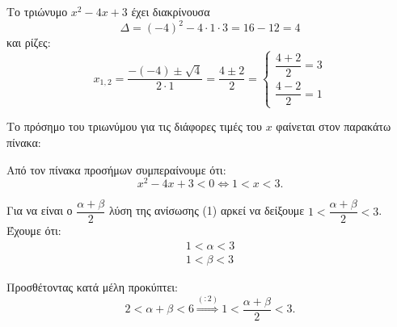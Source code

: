 
\begin{alist}
\item Το τριώνυμο $x^2 - 4x + 3$ έχει διακρίνουσα
\[\Delta = (-4)^2 - 4 \cdot 1 \cdot 3 = 16 - 12 = 4\]
και ρίζες:
\[x_{1,2} = \dfrac{-(-4) \pm \sqrt{4}}{2 \cdot 1} = \dfrac{4 \pm 2}{2} = \begin{cases} \dfrac{4 + 2}{2} = 3 \\ \dfrac{4 - 2}{2} = 1 \end{cases}\]

Το πρόσημο του τριωνύμου για τις διάφορες τιμές του $x$ φαίνεται στον παρακάτω πίνακα:
\begin{center}
\end{center}

Από τον πίνακα προσήμων συμπεραίνουμε ότι:
\[x^2 - 4x + 3 < 0 \Leftrightarrow 1 < x < 3.\]

\item Για να είναι ο $\dfrac{\alpha + \beta}{2}$ λύση της ανίσωσης (1) αρκεί να δείξουμε $1 < \dfrac{\alpha + \beta}{2} < 3$. Έχουμε ότι:
\begin{gather*}
1 < \alpha < 3 \\
1 < \beta < 3
\end{gather*}

Προσθέτοντας κατά μέλη προκύπτει:
\[2 < \alpha + \beta < 6 \stackrel{(:2)}{\Rightarrow} 1 < \dfrac{\alpha + \beta}{2} < 3.\]
\end{alist}

